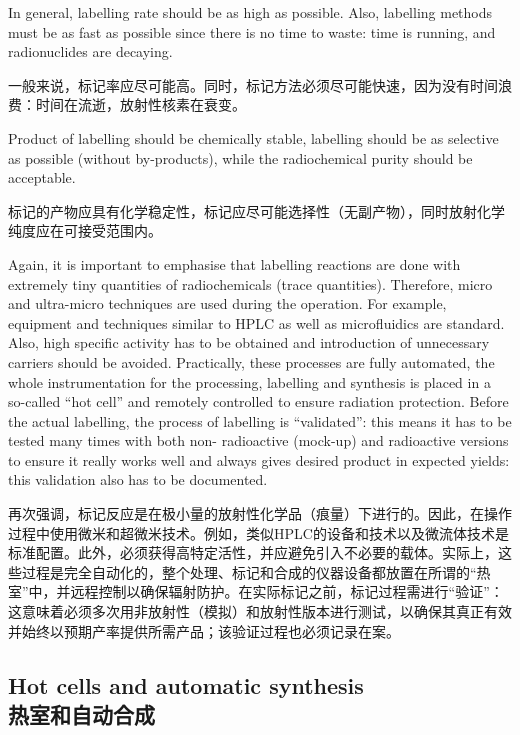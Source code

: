 \documentclass[dvipsnames, svgnames,a4paper,11pt]{article}
\begin{document}
In general, labelling rate should be as high as possible. Also, labelling methods must
be as fast as possible since there is no time to waste: time is running, and
radionuclides are decaying.

一般来说，标记率应尽可能高。同时，标记方法必须尽可能快速，因为没有时间浪费：时间在流逝，放射性核素在衰变。



Product of labelling should be chemically stable, labelling should be as selective as
possible (without by-products), while the radiochemical purity should be acceptable.

标记的产物应具有化学稳定性，标记应尽可能选择性（无副产物），同时放射化学纯度应在可接受范围内。



Again, it is important to emphasise that labelling reactions are done with extremely
tiny quantities of radiochemicals (trace quantities). Therefore, micro and ultra-micro
techniques are used during the operation. For example, equipment and techniques
similar to HPLC as well as microfluidics are standard. Also, high specific activity has
to be obtained and introduction of unnecessary carriers should be avoided.
Practically, these processes are fully automated, the whole instrumentation for the
processing, labelling and synthesis is placed in a so-called “hot cell” and remotely
controlled to ensure radiation protection. Before the actual labelling, the process of
labelling is “validated”: this means it has to be tested many times with both non-
radioactive (mock-up) and radioactive versions to ensure it really works well and
always gives desired product in expected yields: this validation also has to be
documented.

再次强调，标记反应是在极小量的放射性化学品（痕量）下进行的。因此，在操作过程中使用微米和超微米技术。例如，类似HPLC的设备和技术以及微流体技术是标准配置。此外，必须获得高特定活性，并应避免引入不必要的载体。实际上，这些过程是完全自动化的，整个处理、标记和合成的仪器设备都放置在所谓的“热室”中，并远程控制以确保辐射防护。在实际标记之前，标记过程需进行“验证”：这意味着必须多次用非放射性（模拟）和放射性版本进行测试，以确保其真正有效并始终以预期产率提供所需产品；该验证过程也必须记录在案。


\subsection{Hot cells and automatic synthesis\\热室和自动合成}
\end{document}
